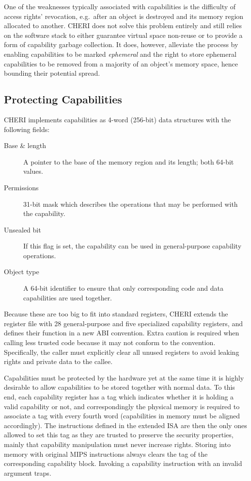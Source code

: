\documentclass[a4paper,12pt,twoside,openright]{report}
\begin{document}
One of the weaknesses typically associated with capabilities is the difficulty of access rights' revocation, e.g.\ after an object is destroyed and its memory region allocated to another. CHERI does not solve this problem entirely and still relies on the software stack to either guarantee virtual space non-reuse or to provide a form of capability garbage collection. It does, however, alleviate the process by enabling capabilities to be marked \emph{ephemeral} and the right to store ephemeral capabilities to be removed from a majority of an object's memory space, hence bounding their potential spread.

\subsection{Protecting Capabilities}

CHERI implements capabilities as 4-word (256-bit) data structures with the following fields:
\begin{description}
	\item[Base \& length] A pointer to the base of the memory region and its length; both 64-bit values.
	\item[Permissions] 31-bit mask which describes the operations that may be performed with the capability.
	\item[Unsealed bit] If this flag is set, the capability can be used in general-purpose capability operations.
	\item[Object type] A 64-bit identifier to ensure that only corresponding code and data capabilities are used together.
\end{description}

Because these are too big to fit into standard registers, CHERI extends the register file with 28 general-purpose and five specialized capability registers, and defines their function in a new ABI convention. Extra caution is required when calling less trusted code because it may not conform to the convention. Specifically, the caller must explicitly clear all unused registers to avoid leaking rights and private data to the callee.

Capabilities must be protected by the hardware yet at the same time it is highly desirable to allow capabilities to be stored together with normal data. To this end, each capability register has a tag which indicates whether it is holding a valid capability or not, and correspondingly the physical memory is required to associate a tag with every fourth word (capabilities in memory must be aligned accordingly). The instructions defined in the extended ISA are then the only ones allowed to set this tag as they are trusted to preserve the security properties, mainly that capability manipulation must never increase rights. Storing into memory with original MIPS instructions always clears the tag of the corresponding capability block. Invoking a capability instruction with an invalid argument traps.
\end{document}
